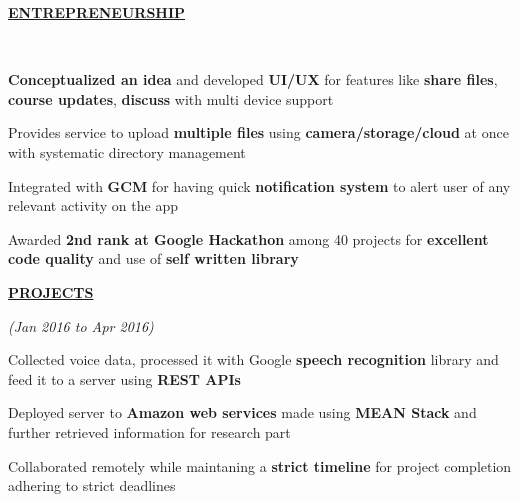 \documentclass[a4paper]{deedy-resume} %
\begin{document}
\sectionspace

{\uppercase\uline{\textbf{\large{Entrepreneurship}}\hfill}}
\microspace

\hfill \\

\begin{tightitemize}
\item \textbf{Conceptualized an idea} and developed \textbf{UI/UX} for features like \textbf{share files}, \textbf{course updates}, \textbf{discuss} with multi device support
\item Provides service to upload \textbf{multiple files} using \textbf{camera/storage/cloud} at once with systematic directory management
\item Integrated with \textbf{GCM} for having quick \textbf{notification system} to alert user of any relevant activity on the app
\item Awarded \textbf{2nd rank at Google Hackathon} among 40 projects for \textbf{excellent code quality} and use of \textbf{self written library}
\end{tightitemize}

\sectionspace


{\uppercase\uline{\textbf{\large{Projects}}\hfill}}

\microspace

\hfill {\textit{\small(Jan 2016 to Apr 2016)}}\\

\begin{tightitemize}
\item  Collected voice data, processed it with Google \textbf{speech recognition} library and feed it to a server using \textbf{REST APIs}
\item  Deployed server to \textbf{Amazon web services} made using \textbf{MEAN Stack} and further retrieved information for research part
\item  Collaborated remotely while maintaning a \textbf{strict timeline} for project completion adhering to strict deadlines
\microspace

\end{tightitemize}
\end{document}
